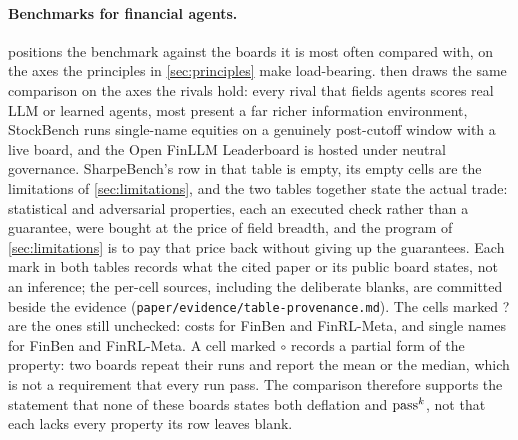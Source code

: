 \paragraph{Benchmarks for financial agents.}  positions the benchmark against the boards it is most often compared with, on the axes the principles in \cref{sec:principles} make load-bearing.  then draws the same comparison on the axes the rivals hold: every rival that fields agents scores real LLM or learned agents, most present a far richer information environment, StockBench runs single-name equities on a genuinely post-cutoff window with a live board, and the Open FinLLM Leaderboard is hosted under neutral governance. SharpeBench's row in that table is empty, its empty cells are the limitations of \cref{sec:limitations}, and the two tables together state the actual trade: statistical and adversarial properties, each an executed check rather than a guarantee, were bought at the price of field breadth, and the program of \cref{sec:limitations} is to pay that price back without giving up the guarantees. Each mark in both tables records what the cited paper or its public board states, not an inference; the per-cell sources, including the deliberate blanks, are committed beside the evidence (\texttt{paper/evidence/table-provenance.md}). The cells marked ? are the ones still unchecked: costs for FinBen and FinRL-Meta, and single names for FinBen and FinRL-Meta. A cell marked $\circ$ records a partial form of the property: two boards repeat their runs and report the mean or the median, which is not a requirement that every run pass. The comparison therefore supports the statement that none of these boards states both deflation and $\text{pass}^{k}$, not that each lacks every property its row leaves blank.

